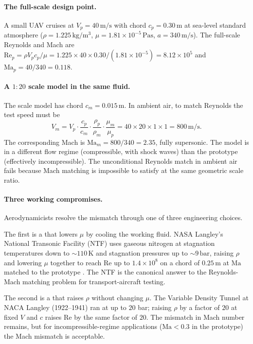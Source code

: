 \paragraph{The full-scale design point.} A small UAV cruises at
$V_{p} = 40 \,\si{\meter\per\second}$ with chord
$c_{p} = 0.30 \,\si{\meter}$ at sea-level standard atmosphere
($\rho = 1.225 \,\si{\kilogram\per\meter\cubed}$, $\mu = 1.81
\times 10^{-5} \,\si{\pascal\second}$, $a = 340 \,\si{\meter\per
\second}$). The full-scale Reynolds and Mach are
$\mathrm{Re}_{p} = \rho V_{p} c_{p}/\mu = 1.225 \times 40 \times
0.30/(1.81 \times 10^{-5}) = 8.12 \times 10^{5}$ and
$\mathrm{Ma}_{p} = 40/340 = 0.118$.

\paragraph{A $1{:}20$ scale model in the same fluid.} The scale
model has chord $c_{m} = 0.015 \,\si{\meter}$. In ambient air, to
match Reynolds the test speed must be
\[
V_{m} = V_{p} \cdot \frac{c_{p}}{c_{m}}
  \cdot \frac{\rho_{p}}{\rho_{m}} \cdot \frac{\mu_{m}}{\mu_{p}}
  = 40 \times 20 \times 1 \times 1 = 800 \,\si{\meter\per\second}.
\]
The corresponding Mach is $\mathrm{Ma}_{m} = 800/340 = 2.35$,
fully supersonic. The model is in a different flow regime
(compressible, with shock waves) than the prototype (effectively
incompressible). The unconditional Reynolds match in ambient air
fails because Mach matching is impossible to satisfy at the same
geometric scale ratio.

\paragraph{Three working compromises.} Aerodynamicists resolve the
mismatch through one of three engineering choices.

The first is a  that lowers $\mu$ by
cooling the working fluid. NASA Langley's National Transonic
Facility (NTF) uses gaseous nitrogen at stagnation temperatures
down to $\sim 110 \,\si{\kelvin}$ and stagnation pressures up to
$\sim 9 \,\text{bar}$, raising $\rho$ and lowering $\mu$ together
to reach $\mathrm{Re}$ up to $1.4 \times 10^{8}$ on a chord of
$0.25 \,\si{\meter}$ at $\mathrm{Ma}$ matched to the prototype
\cite{web:ch02t3-nasa-ntf}. The NTF is the canonical answer to
the Reynolds-Mach matching problem for transport-aircraft testing.

The second is a  that raises $\rho$
without changing $\mu$. The Variable Density Tunnel at NACA
Langley (1922--1941) ran at up to $20$ bar; raising $\rho$ by a
factor of $20$ at fixed $V$ and $c$ raises $\mathrm{Re}$ by the
same factor of $20$. The mismatch in Mach number remains, but
for incompressible-regime applications ($\mathrm{Ma} < 0.3$ in
the prototype) the Mach mismatch is acceptable.

